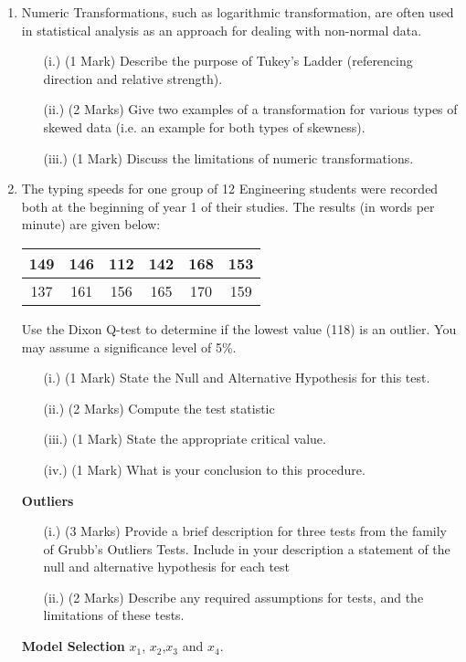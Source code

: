 \documentclass[]{report}
\begin{document}
\begin{enumerate}
\item 
Numeric Transformations, such as logarithmic transformation, are often used in statistical analysis as an approach for dealing with non-normal data.
\begin{itemize}
	\item[(i.)] (1 Mark) Describe the purpose of Tukey's Ladder (referencing direction and relative strength).
	\item[(ii.)] (2 Marks) Give two examples of a transformation for various types of skewed data (i.e. an example for both types of skewness).
	\item[(iii.)] (1 Mark) Discuss the limitations of numeric transformations.
\end{itemize}
\bigskip

\item 
The typing speeds for one group of 12 Engineering students were recorded both at the beginning of year 1 of their studies. The results (in words per minute) are given below:

\begin{center}
	\begin{tabular}{|c|c|c|c|c|c|}
		\hline
		149  & 146 & 112 & 142 & 168& 153\\ \hline
		137 & 161 & 156& 165&  170&  159
		\\ \hline
	\end{tabular}
\end{center}
Use the Dixon Q-test to determine if the lowest value (118) is an outlier. You may assume a significance level of 5\%.
\begin{itemize}
	\item[(i.)](1 Mark)	State the Null and Alternative Hypothesis for this test.
	\item[(ii.)](2 Marks) Compute the test statistic
	\item[(iii.)](1 Mark) State the appropriate critical value.
	\item[(iv.)](1 Mark) What is your conclusion to this procedure.
\end{itemize}

\item [\textbf{Outliers}]
\begin{itemize}
	\item[(i.)] (3 Marks) Provide a brief description for three tests from the family of Grubb's  Outliers Tests. Include in your description a statement of the null and alternative hypothesis for each test
	\item[(ii.)] (2 Marks) Describe any required assumptions for tests, and the limitations of these tests.
\end{itemize}
\item [\textbf{Model Selection}]
$x_1$, $x_2$,$x_3$ and $x_4$.


\end{enumerate}
\end{document}
